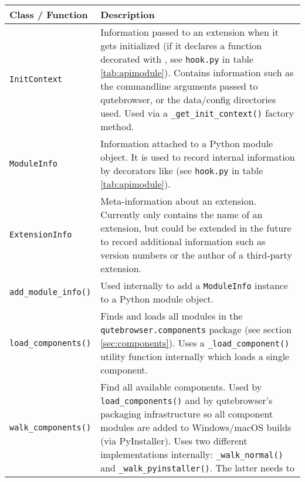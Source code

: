 \begin{table}[H]
  \centering
  \begin{tabulary}{\linewidth}{lL}
    \toprule
    Class / Function & Description \\
    \midrule
    \verb|InitContext| & Information passed to an extension when it gets
                         initialized (if it declares a function decorated with
                         , see \verb|hook.py| in table
                         \ref{tab:apimodule}). Contains information such as the
                         commandline arguments passed to qutebrowser, or the
                         data/config directories used. Used via a
                         \verb|_get_init_context()| factory method.\\
    \verb|ModuleInfo| & Information attached to a Python module object. It is
                        used to record internal information by decorators like
                         (see \verb|hook.py| in table
                        \ref{tab:apimodule}). \\
    \verb|ExtensionInfo| & Meta-information about an extension. Currently only
                           contains the name of an extension, but could be
                           extended in the future to record additional
                           information such as version numbers or the author of
                           a third-party extension. \\
    \verb|add_module_info()| & Used internally to add a \verb|ModuleInfo|
                               instance to a Python module object. \\
    \verb|load_components()| & Finds and loads all modules in the
                               \verb|qutebrowser.components| package (see
                               section \ref{sec:components}). Uses a
                               \verb|_load_component()| utility function
                               internally which loads a single component. \\
    \verb|walk_components()| & Find all available components. Used by
                               \verb|load_components()| and by qutebrowser's
                               packaging infrastructure so all component modules
                               are added to Windows/macOS builds (via
                               PyInstaller). Uses two different implementations
                               internally: \verb|_walk_normal()| and
                               \verb|_walk_pyinstaller()|. The latter needs to

\end{tabulary}
\end{table}

